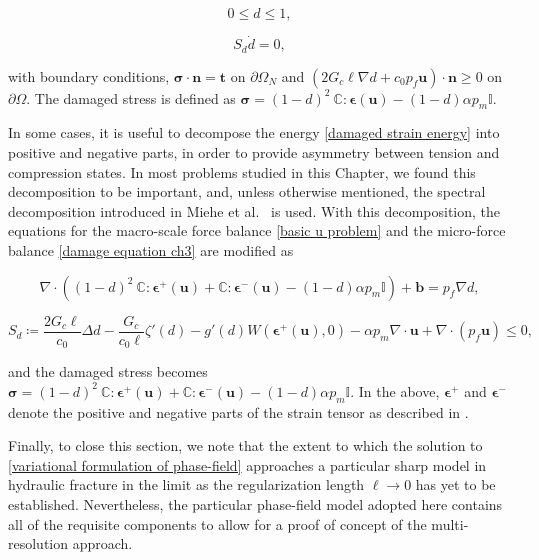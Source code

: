\begin{equation}
   0 \le d \le 1,
\end{equation}

\begin{equation}
    S_d\dot{d} = 0,
    \label{eq:ddot-strong}
\end{equation}

with boundary conditions, $\boldsymbol\sigma \cdot \textbf{n} = \textbf{t}$ on $\partial \Omega_N$ and $(2G_c\ell\nabla d +c_0p_f\textbf{u})\cdot \textbf{n} \ge 0$ on $\partial \Omega$. The damaged stress is defined as $\boldsymbol\sigma = (1-d)^2\ \mathbb{C}:\boldsymbol\epsilon(\textbf{u}) -(1-d)\alpha p_m \mathbb{I}$.

In some cases, it is useful to decompose the energy \eqref{damaged strain energy} into positive and negative parts, in order to provide asymmetry between tension and compression states. In most problems studied in this Chapter, we found this decomposition to be important, and, unless otherwise mentioned, the spectral decomposition introduced in Miehe et al.~\cite{miehe2010phase} is used. With this decomposition, the equations for the macro-scale force balance \eqref{basic u problem} and the micro-force balance \eqref{damage equation ch3} are modified as

\begin{equation}\label{basic u problem spectral}\tag{3.22a}
    \nabla \cdot \left( (1-d)^2\ \mathbb{C}:\boldsymbol\epsilon^+(\textbf{u}) + \mathbb{C}:\boldsymbol\epsilon^-(\textbf{u})-(1-d)\alpha p_m \mathbb{I}\right) + \textbf{b} = p_f\nabla d, 
\end{equation}

\begin{equation}\label{damage equation spectral}\tag{3.23a}
    S_d \coloneqq  \dfrac{2G_c\ell}{c_0}\Delta d - \dfrac{G_c}{c_0\ell}\zeta'(d)-g'(d)W(\boldsymbol{\epsilon^+}(\boldsymbol{\textbf{u}}),0) - \alpha p_m\nabla \cdot \textbf{u} + \nabla \cdot (p_f\textbf{u}) \le 0,
\end{equation}

and the damaged stress becomes $\boldsymbol\sigma = (1-d)^2\ \mathbb{C}:\boldsymbol\epsilon^+(\textbf{u}) + \mathbb{C}:\boldsymbol\epsilon^-(\textbf{u})-(1-d)\alpha p_m \mathbb{I}$. In the above, $\boldsymbol\epsilon^+$ and $\boldsymbol\epsilon^-$ denote the positive and negative parts of the strain tensor as described in \cite{miehe2010phase}. 

Finally, to close this section, we note that the extent to which the solution to \eqref{variational formulation of phase-field} approaches a particular sharp model in hydraulic fracture in the limit as the regularization length $\ell\rightarrow 0$ has yet to be established.  Nevertheless, the particular phase-field model adopted here contains all of the requisite components to allow for a proof of concept of the multi-resolution approach.  





